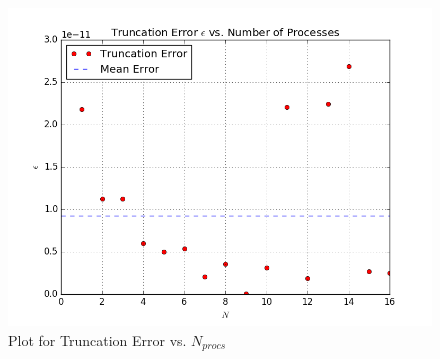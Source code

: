 \documentclass[12pt]{article}
\newenvironment{problem}[2][Problem]{\begin{trivlist}
\item[\hskip \labelsep {\bfseries #1}\hskip \labelsep {\bfseries #2.}]}{\end{trivlist}}
\begin{document}
\begin{problem}{1}
\begin{figure}[H]
\centering
  \includegraphics[scale=0.7]{part_c.png}
 \caption{Plot for Truncation Error vs. $N_{procs}$}
\label{label}
\end{figure}
\end{problem}
\end{document}

